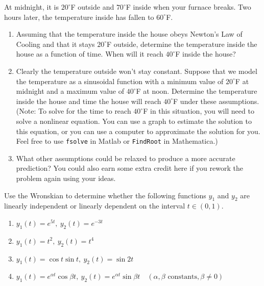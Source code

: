 \documentclass[12pt,letterpaper]{hmcpset}
\begin{document}
\begin{problem}[2]
    At midnight, it is $20^\circ$F outside and $70^\circ$F inside
    when your furnace breaks. Two hours later, the temperature inside
    has fallen to $60^\circ$F. 

    \begin{center}
    \end{center}

    \begin{enumerate}
        \item Assuming that the temperature inside the house obeys Newton's
            Law of Cooling and that it stays $20^\circ$F outside, determine the
            temperature inside the house as a function of time. When will it
            reach $40^\circ$F inside the house?
        \item Clearly the temperature outside won't stay constant.  Suppose that we model the temperature as a sinusoidal function with a minimum value of $20^\circ$F at midnight and a maximum value of $40^\circ$F at noon.  Determine the temperature inside the house and time the house will reach $40^\circ$F under these assumptions.  (Note: To solve for the time to reach $40^\circ$F in this situation, you will need to solve a nonlinear equation.  You can use a graph to estimate the solution to this equation, or you can use a computer to approximate the solution for you. Feel free to use \texttt{fsolve} in Matlab or \texttt{FindRoot} in Mathematica.)
        \item What other assumptions could be relaxed to produce a more accurate prediction?  You could also earn some extra credit here if you rework the problem again using your ideas.
    \end{enumerate}
\end{problem}

\begin{solution}
    \vfill
\end{solution}
\newpage

\begin{problem}[3]
    Use the Wronskian to determine whether the following functions $y_1$ and $y_2$ are linearly independent or linearly dependent on the interval $t \in (0,1)$.
    \begin{enumerate}
        \item $y_1(t) = e^{5t}, \ y_2(t)=e^{-3t}$
        \item $y_1(t) = t^2, \ y_2(t) = t^4 $
        \item $y_1(t) = \cos t \sin t, \ y_2(t) = \sin 2t$
        \item $y_1(t) = e^{\alpha t} \cos \beta t, \ y_2(t) = e^{\alpha t} \sin \beta t \quad (\alpha,\beta \text{ constants}, \beta \neq 0)$
    \end{enumerate}
\end{problem}
\end{document}
